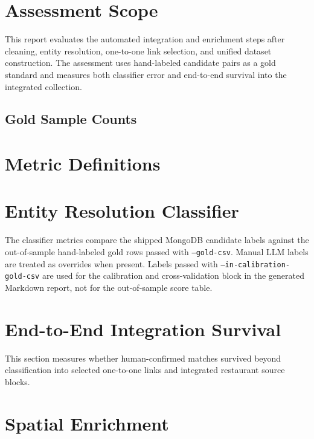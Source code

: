 \section{Assessment Scope}

This report evaluates the automated integration and enrichment steps after
cleaning, entity resolution, one-to-one link selection, and unified dataset
construction. The assessment uses hand-labeled candidate pairs as a gold
standard and measures both classifier error and end-to-end survival into the
integrated collection.

\subsection*{Gold Sample Counts}


\section{Metric Definitions}


\section{Entity Resolution Classifier}

The classifier metrics compare the shipped MongoDB candidate labels against the
out-of-sample hand-labeled gold rows passed with \texttt{--gold-csv}. Manual LLM
labels are treated as overrides when present. Labels passed with
\texttt{--in-calibration-gold-csv} are used for the calibration and
cross-validation block in the generated Markdown report, not for the
out-of-sample score table.


\section{End-to-End Integration Survival}

This section measures whether human-confirmed matches survived beyond
classification into selected one-to-one links and integrated restaurant source
blocks.


\section{Spatial Enrichment}

